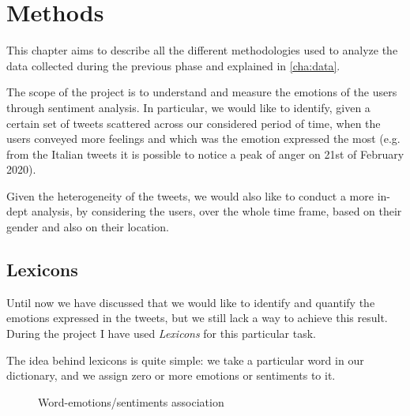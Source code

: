 \chapter{Methods}
\label{cha:methods}

This chapter aims to describe all the different methodologies used to analyze the data collected during the previous phase and explained in \autoref{cha:data}. 

The scope of the project is to understand and measure the emotions of the users through sentiment analysis. In particular, we would like to identify, given a certain set of tweets scattered across our considered period of time, when the users conveyed more feelings and which was the emotion expressed the most (e.g. from the Italian tweets it is possible to notice a peak of anger on 21st of February 2020).

Given the heterogeneity of the tweets, we would also like to conduct a more in-dept analysis, by considering the users, over the whole time frame, based on their gender and also on their location.

\section{Lexicons}
\label{lexicons}

Until now we have discussed that we would like to identify and quantify the emotions expressed in the tweets, but we still lack a way to achieve this result. During the project I have used \textit{Lexicons} for this particular task.

The idea behind lexicons is quite simple: we take a particular word in our dictionary, and we assign zero or more emotions or sentiments to it.
\begin{figure}
	\caption{Word-emotions/sentiments association}
	\label{fig:word-association}
\end{figure}

